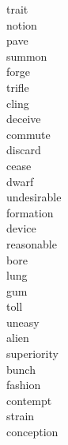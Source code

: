 \documentclass[a4paper, 11pt]{ctexart}
\begin{document}
\begin{multicols*}{3}
\begin{description}
\item[trait]

\item[notion]

\item[pave]

\item[summon]

\item[forge]

\item[trifle]

\item[cling]

\item[deceive]

\item[commute]

\item[discard]

\item[cease]

\item[dwarf]

\item[undesirable]

\item[formation]

\item[device]

\item[reasonable]

\item[bore]

\item[lung]

\item[gum]

\item[toll]

\item[uneasy]

\item[alien]

\item[superiority]

\item[bunch]

\item[fashion]

\item[contempt]

\item[strain]

\item[conception]


\end{description}
\end{multicols*}
\end{document}
